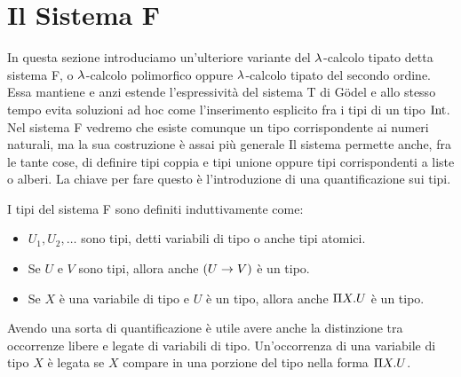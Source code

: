 \documentclass[]{marticle}
\begin{document}
\section{Il Sistema F}

In questa sezione introduciamo un'ulteriore variante del $\l$-calcolo tipato
detta sistema F, o $\l$-calcolo polimorfico oppure $\l$-calcolo tipato del
secondo ordine. Essa mantiene e anzi estende l'espressivit\`a del sistema T di
G\"odel e allo stesso tempo evita soluzioni ad hoc come l'inserimento esplicito
fra i tipi di un tipo $\tint$. Nel sistema F vedremo che esiste comunque un tipo
corrispondente ai numeri naturali, ma la sua costruzione \`e assai pi\`u
generale Il sistema permette anche, fra le tante cose, di definire tipi coppia e
tipi unione oppure tipi corrispondenti a liste o alberi. La chiave per fare
questo \`e l'introduzione di una quantificazione sui tipi.

\begin{block}[Definizione]
    I tipi del sistema F sono definiti induttivamente come:
    \begin{itemize}
        \item $U_1, U_2, \dots$ sono tipi, detti variabili di tipo o anche tipi
            atomici.
        \item Se $U$ e $V$ sono tipi, allora anche $(U\rar V)$ \`e un tipo.
        \item Se $X$ \`e una variabile di tipo e $U$ \`e un tipo, allora anche
            $\P X. U$ \`e un tipo.
    \end{itemize}
\end{block}

Avendo una sorta di quantificazione \`e utile avere anche la distinzione tra
occorrenze libere e legate di variabili di tipo. Un'occorrenza di una variabile
di tipo $X$ \`e legata se $X$ compare in una porzione del tipo nella forma $\P
X. U$.
\end{document}
